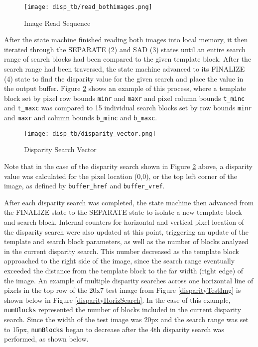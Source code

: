 \par
\begin{figure}[H]
	\centerline{\texttt{[image: disp\_tb/read\_bothimages.png]}}
	\caption{Image Read Sequence}
	\label{disparityImgRead}
\end{figure}
\par
After the state machine finished reading both images into local memory, it then iterated through the SEPARATE (2) and SAD (3) states until an entire search range of search blocks had been compared to the given template block. After the search range had been traversed, the state machine advanced to its FINALIZE (4) state to find the disparity value for the given search and place the value in the output buffer. Figure \ref{disparityVector} shows an example of this process, where a template block set by pixel row bounds \texttt{minr} and \texttt{maxr} and pixel column bounds \texttt{t\_minc} and \texttt{t\_maxc} was compared to 15 individual search blocks set by row bounds \texttt{minr} and \texttt{maxr} and column bounds \texttt{b\_minc} and \texttt{b\_maxc}.
\par
\begin{figure}[H]
	\centerline{\texttt{[image: disp\_tb/disparity\_vector.png]}}
	\caption{Disparity Search Vector}
	\label{disparityVector}
\end{figure}
\par
Note that in the case of the disparity search shown in Figure \ref{disparityVector} above, a disparity value was calculated for the pixel location (0,0), or the top left corner of the image, as defined by \texttt{buffer\_href} and \texttt{buffer\_vref}.
\par
After each disparity search was completed, the state machine then advanced from the FINALIZE state to the SEPARATE state to isolate a new template block and search block. Internal counters for horizontal and vertical pixel location of the disparity search were also updated at this point, triggering an update of the template and search block parameters, as well as the number of blocks analyzed in the current disparity search. This number decreased as the template block approached to the right side of the image, since the search range eventually exceeded the distance from the template block to the far width (right edge) of the image. An example of multiple disparity searches across one horizontal line of pixels in the top row of the 20x7 test image from Figure \ref{disparityTestImg} is shown below in Figure \ref{disparityHorizSearch}. In the case of this example, \texttt{numBlocks} represented the number of blocks included in the current disparity search. Since the width of the test image was 20px and the search range was set to 15px, \texttt{numBlocks} began to decrease after the 4th disparity search was performed, as shown below.
